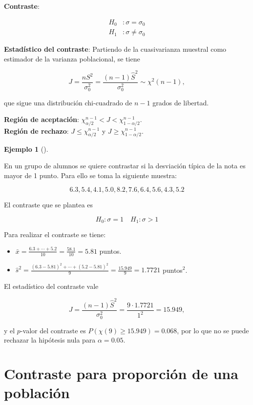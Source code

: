 \documentclass[
  a4paper,
]{scrreport}
\providecommand{\tightlist}{%
  \setlength{\itemsep}{0pt}\setlength{\parskip}{0pt}}\usepackage{longtable,booktabs,array}
\theoremstyle{plain}
\theoremstyle{definition}
\newtheorem{example}{Ejemplo}[chapter]
\theoremstyle{definition}
\theoremstyle{remark}
\begin{document}
\textbf{Contraste}:

\begin{align*}
H_0 &: \sigma=\sigma_0 \\
H_1 &: \sigma\neq \sigma_0
\end{align*}

\textbf{Estadístico del contraste}: Partiendo de la cuasivarianza
muestral como estimador de la varianza poblacional, se tiene

\[
J=\frac{nS^2}{\sigma_0^2} = \frac{(n-1)\hat{S}^2}{\sigma_0^2}\sim \chi^2(n-1),
\]

que sigue una distribución chi-cuadrado de \(n-1\) grados de libertad.

\textbf{Región de aceptación}:
\(\chi_{\alpha/2}^{n-1} < J < \chi_{1-\alpha/2}^{n-1}\).\\
\textbf{Región de rechazo}: \(J\leq \chi_{\alpha/2}^{n-1}\) y
\(J\geq \chi_{1-\alpha/2}^{n-1}\).

\begin{example}[]\protect\hypertarget{exm-contraste-varianza}{}\label{exm-contraste-varianza}

En un grupo de alumnos se quiere contrastar si la desviación típica de
la nota es mayor de 1 punto. Para ello se toma la siguiente muestra:

\[
6.3, 5.4, 4.1, 5.0, 8.2, 7.6, 6.4, 5.6, 4.3, 5.2
\]

El contraste que se plantea es

\[
H_0: \sigma=1 \quad H_1: \sigma>1
\]

Para realizar el contraste se tiene:

\begin{itemize}
\tightlist
\item
  \(\bar x = \frac{6.3+\cdots+5.2}{10}=\frac{58.1}{10}=5.81\) puntos.
\item
  \(\hat s^2 = \frac{(6.3-5.81)^2+\cdots+(5.2-5.81)^2}{9} = \frac{15.949}{9}=1.7721\)
  puntos\(^2\).
\end{itemize}

El estadístico del contraste vale

\[
J= \frac{(n-1)\hat{S}^2}{\sigma_0^2} = \frac{9\cdot1.7721}{1^2} = 15.949,
\]

y el \(p\)-valor del contraste es \(P(\chi(9)\geq 15.949) = 0.068\), por
lo que no se puede rechazar la hipótesis nula para \(\alpha=0.05\).

\end{example}

\section{Contraste para proporción de una
población}\label{contraste-para-proporciuxf3n-de-una-poblaciuxf3n}
\end{document}
